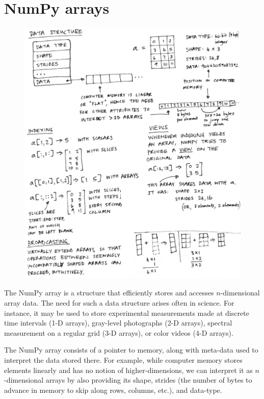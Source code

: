 
\section*{NumPy arrays}

\begin{figure}
  \centering
  \includegraphics[width=\textwidth]{static/sketches/array-concepts}
  \caption{
   }
  \label{fig:arrayconcepts}
\end{figure}

The NumPy array is a structure that efficiently stores and accesses
$n$-dimensional array data\cite{vanderwalt2011numpy}.
The need for such a data structure arises often in science.
For instance, it may be used to store experimental measurements made at
discrete time intervals (1-D arrays), gray-level photographs (2-D arrays),
spectral measurement on a regular grid (3-D arrays), or color videos (4-D
arrays).

The NumPy array consists of a pointer to memory, along with meta-data used to
interpret the data stored there.
For example, while computer memory stores elements linearly and has no notion
of higher-dimensions, we can interpret it as $n$-dimensional arrays by also
providing its shape, strides (the number of bytes to advance in memory to skip
along rows, columns, etc.), and data-type.

